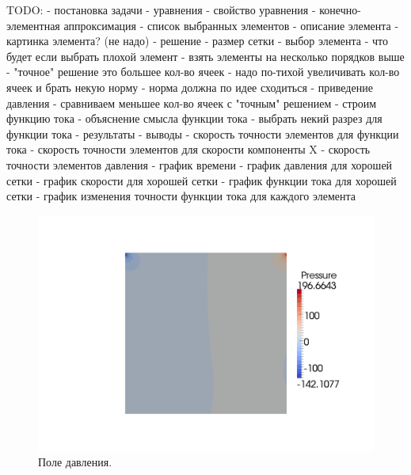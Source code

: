 \documentclass[12pt]{article}
\begin{document}
TODO:
- постановка задачи
    - уравнения
    - свойство уравнения
    - конечно-элементная аппроксимация
    - список выбранных элементов
        - описание элемента
        - картинка элемента? (не надо)
- решение
    - размер сетки
    - выбор элемента
        - что будет если выбрать плохой элемент
        - взять элементы на несколько порядков выше
    - "точное" решение это большее кол-во ячеек
        - надо по-тихой увеличивать кол-во ячеек и брать некую норму
        - норма должна по идее сходиться
    - приведение давления
    - сравниваем меньшее кол-во ячеек с "точным" решением
    - строим функцию тока
        - объяснение смысла функции тока
        - выбрать некий разрез для функции тока
- результаты
    - выводы
        - скорость точности элементов для функции тока
        - скорость точности элементов для скорости компоненты X
        - скорость точности элементов давления
	- график времени
	- график давления для хорошей сетки
	- график скорости для хорошей сетки
	- график функции тока для хорошей сетки
	- график изменения точности функции тока для каждого элемента
	
	


\begin{figure}
\begin{center}
\includegraphics[scale=0.4]{pics/pressure}
\caption{Поле давления.}
\label{fg:pressure}
\end{center}
\end{figure}
\end{document}
